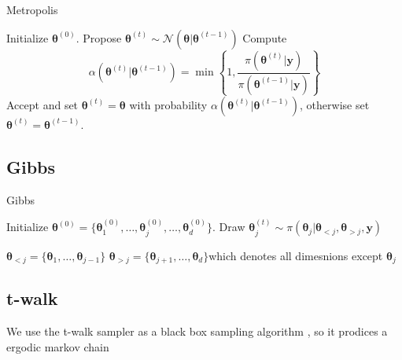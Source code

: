 \begin{algorithm}
	\caption{Metropolis}
	\begin{algorithmic}[1]
		\STATE Initialize \( \bm{\theta}^{(0)} \).
		\STATE Propose \( \bm{\theta}^{(t)} \sim \mathcal{N}(\bm{\theta} | \bm{\theta}^{(t-1)}) \)
		\STATE Compute
			\[ \alpha(\bm{\theta}^{(t)} | \bm{\theta}^{(t-1)}) = \min \left\{ 1, \frac{\pi(\bm{\theta}^{(t)}  | \bm{y}) }{\pi(\bm{\theta}^{(t-1)}| \bm{y}) } \right\} \]
		\STATE Accept and set \( \bm{\theta}^{(t)} = \bm{\theta} \) with probability \( \alpha(\bm{\theta}^{(t)}  | \bm{\theta}^{(t-1)}) \), otherwise set \(\bm{\theta}^{(t)} = \bm{\theta}^{(t-1)} \).
		\ENDFOR
	\end{algorithmic}
\end{algorithm}

\subsection{Gibbs}
\begin{algorithm}
	\caption{Gibbs}
	\begin{algorithmic}[1]
		\STATE Initialize \( \bm{\theta}^{(0)} = \{\bm{\theta}^{(0)}_{1}, \dots, \bm{\theta}^{(0)}_{j},\dots,\bm{\theta}^{(0)}_{d} \} \).
		\STATE Draw \(\bm{\theta}_j^{(t)} \sim  \pi(\bm{\theta}_j | \bm{\theta}_{<j}, \bm{\theta}_{>j} , \bm{y} )\) 

		\ENDFOR
		\ENDFOR
	\end{algorithmic}
\end{algorithm}

$ \bm{\theta}_{<j} = \{\bm{\theta}_{1}, \dots, \bm{\theta}_{j-1} \} $ 
$ \bm{\theta}_{>j} = \{\bm{\theta}_{j+1}, \dots, \bm{\theta}_{d}\} $which denotes all dimesnions except $ \bm{\theta}_{j}$
\subsection{t-walk}
We use the t-walk sampler as a black box sampling algorithm
\cite{}, so it prodices a ergodic markov chain


